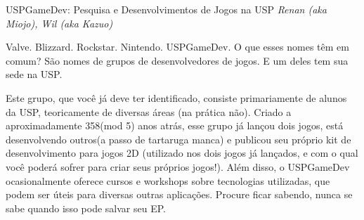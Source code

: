 \begin{secao}{USPGameDev: Pesquisa e Desenvolvimentos de Jogos na USP}
{\em Renan (aka Miojo), Wil (aka Kazuo)}

Valve. Blizzard. Rockstar. Nintendo. USPGameDev. O que esses nomes têm em comum?
São nomes de grupos de desenvolvedores de jogos. E um deles tem sua sede na USP.

Este grupo, que você já deve ter identificado, consiste primariamente de alunos
da USP, teoricamente de diversas áreas (na prática não). Criado a aproximadamente
358(mod 5) anos atrás, esse grupo já lançou dois jogos, está desenvolvendo
outros(a passo de tartaruga manca) e publicou seu próprio kit de desenvolvimento
para jogos 2D (utilizado nos dois jogos já lançados, e com o qual você poderá
sofrer para criar seus próprios jogos!). Além disso, o USPGameDev ocasionalmente
oferece cursos e workshops sobre tecnologias utilizadas, que podem ser úteis para
diversas outras aplicações. Procure ficar sabendo, nunca se sabe quando isso pode
salvar seu EP. 

\end{secao}
